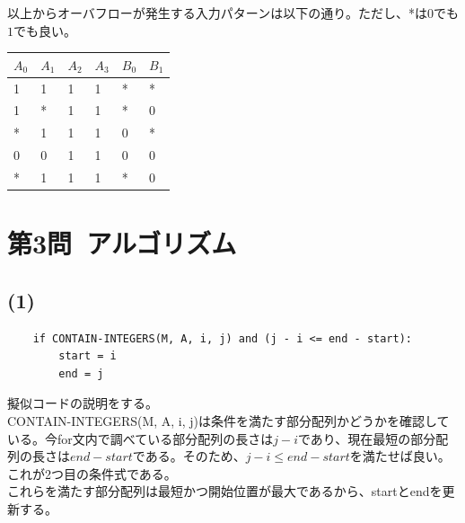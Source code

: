 \documentclass[a4paper,12pt,xelatex,ja=standard]{bxjsarticle}
\begin{document}
  以上からオーバフローが発生する入力パターンは以下の通り。ただし、*は$0$でも$1$でも良い。
  \begin{center}
    \centering
    \begin{tabular}{|l|l|l|l|l|l|}
    \hline
    $A_0$ & $A_1$ & $A_2$ & $A_3$ & $B_0$ & $B_1$ \\ \hline \hline
    1  & 1  & 1  & 1  & *  & *  \\ \hline
    1  & *  & 1  & 1  & *  & 0  \\ \hline
    *  & 1  & 1  & 1  & 0  & *  \\ \hline
    0  & 0  & 1  & 1  & 0  & 0  \\ \hline
    *  & 1  & 1  & 1  & *  & 0  \\ \hline
    \end{tabular}
  \end{center}

\section*{第3問\ アルゴリズム}
  \subsection*{(1)}
  \begin{lstlisting}
    if CONTAIN-INTEGERS(M, A, i, j) and (j - i <= end - start):
        start = i
        end = j
  \end{lstlisting}
  擬似コードの説明をする。\\
  CONTAIN-INTEGERS(M, A, i, j)は条件を満たす部分配列かどうかを確認している。今for文内で調べている部分配列の長さは$j-i$であり、現在最短の部分配列の長さは$end-start$である。そのため、$j-i \leq end-start$を満たせば良い。これが2つ目の条件式である。\\
  これらを満たす部分配列は最短かつ開始位置が最大であるから、startとendを更新する。
\end{document}
